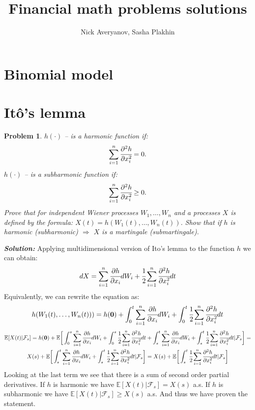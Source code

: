 \documentclass[a4paper, 12pt]{article}
\author{Nick Averyanov, Sasha Plakhin}
\title{Financial math problems solutions}
\theoremstyle{problemstyle}
\newtheorem{problem}{Problem}[section]
\newenvironment{solution}
{\textit{\textbf{Solution:}}}
{}
\newcommand{\E}{\mathbb{E}}
\begin{document}
\maketitle

\newpage
\tableofcontents{}

\newpage
\section{Binomial model}

\section{Itô's lemma}
\begin{problem}
$h(\cdot)$ -- is a harmonic function if:
$$
\sum_{i=1}^n \cfrac{\partial^2 h}{\partial x_i^2} = 0.
$$
$h(\cdot) $ -- is a subharmonic function if:
$$
\sum_{i=1}^n \cfrac{\partial^2 h}{\partial x_i^2} \geq 0.
$$
Prove that for independent  Wiener processes $W_1, \ldots, W_n$ and a processes $X$ is defined by the formula: $X(t) = h(W_1(t), \ldots, W_n(t))$. Show that if $h$ is harmonic (subharmonic) $\Rightarrow$  $X$ is a martingale (submartingale).
\end{problem}

\begin{solution}
	Applying multidimensional version of Ito's lemma to the function $h$ we can obtain:
	$$
	dX = \sum_{i=1}^n \cfrac{\partial h}{\partial x_i} dW_i + \cfrac{1}{2} \sum_{i=1}^n \cfrac{\partial^2 h}{\partial x_i^2} dt
	$$
	Equivalently, we can rewrite the equation as:
	$$
	h(W_1(t), \ldots, W_n(t)) ) = h(\boldsymbol{0}) + \int_0^t  \sum_{i=1}^n \cfrac{\partial h}{\partial x_i} dW_i + \int_0^t\cfrac{1}{2} \sum_{i=1}^n \cfrac{\partial^2 h}{\partial x_i^2} dt
	$$
	\begin{multline*}
		\E[X(t)| \mathcal{F}_s] = h(\boldsymbol{0})  + \E\bigg[ \int_0^s  \sum_{i=1}^n \cfrac{\partial h}{\partial x_i} dW_i + \int_0^s\cfrac{1}{2} \sum_{i=1}^n \cfrac{\partial^2 h}{\partial x_i^2} dt + \int_s^t  \sum_{i=1}^n \cfrac{\partial h}{\partial x_i} dW_i + \int_s^t\cfrac{1}{2} \sum_{i=1}^n \cfrac{\partial^2 h}{\partial x_i^2} dt | \mathcal{F}_s \bigg ] =  \\
		X(s) + \E \bigg[ \int_s^t  \sum_{i=1}^n \cfrac{\partial h}{\partial x_i} dW_i + \int_s^t\cfrac{1}{2} \sum_{i=1}^n \cfrac{\partial^2 h}{\partial x_i^2} dt | \mathcal{F}_s \bigg ] = X(s) + \E \bigg[ \int_s^t\cfrac{1}{2} \sum_{i=1}^n \cfrac{\partial^2 h}{\partial x_i^2} dt | \mathcal{F}_s \bigg ]
	\end{multline*}
	Looking at the last term we see that there is a sum of second order partial derivatives. If $h$ is harmonic we have $\E[X(t)|\mathcal{F}_s] = X(s)$ a.s. If  $h$ is subharmonic we have $\E[X(t)|\mathcal{F}_s] \geq X(s)$ a.s. And thus we have proven the statement.

\end{solution}
\end{document}
